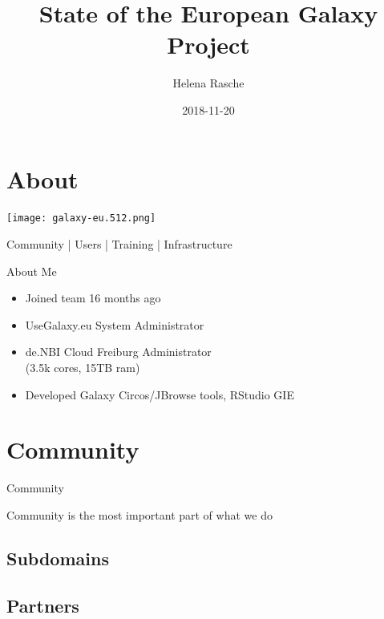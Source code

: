 \documentclass[12pt]{euslides}
\title[Galaxy EU]{State of the European Galaxy Project}
\author{Helena Rasche}
\date{2018-11-20}
\begin{document}
\frame{\titlepage}

\section{About}
\begin{frame}{}
\texttt{[image: galaxy-eu.512.png]}
\ \\
\begin{center}
	Community | Users | Training | Infrastructure
\end{center}
\end{frame}

\begin{frame}{About Me}
	\begin{itemize}
		\item Joined team 16 months ago
		\item UseGalaxy.eu System Administrator
		\item de.NBI Cloud Freiburg Administrator \\(3.5k cores, 15TB ram)
		\item Developed Galaxy Circos/JBrowse tools, RStudio GIE
	\end{itemize}
\end{frame}

\section{Community}
\begin{frame}{Community}
	\begin{center}
		\Large Community is the most important part of what we do
	\end{center}
\end{frame}

\subsection{Subdomains}
{%
	\begin{frame}[plain]
	\end{frame}
}

\subsection{Partners}
{%
	\begin{frame}[plain]
	\end{frame}
}
\end{document}
